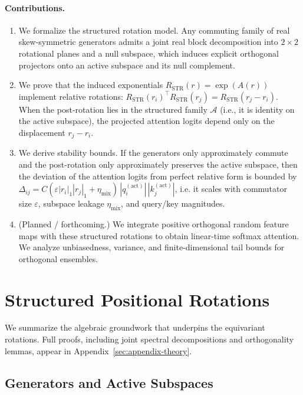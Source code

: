 \documentclass[11pt]{article}
\begin{document}
\paragraph{Contributions.}
\begin{enumerate}[leftmargin=1.5em]
  \item We formalize the structured rotation model. Any commuting family of real skew-symmetric generators admits a joint real block decomposition into $2\times 2$ rotational planes and a null subspace, which induces explicit orthogonal projectors onto an active subspace and its null complement.
  \item We prove that the induced exponentials $R_{\mathrm{STR}}(r) = \exp(A(r))$ implement relative rotations: $R_{\mathrm{STR}}(r_i)^\top R_{\mathrm{STR}}(r_j) = R_{\mathrm{STR}}(r_j - r_i)$. When the post-rotation lies in the structured family $\mathcal{A}$ (i.e., it is identity on the active subspace), the projected attention logits depend only on the displacement $r_j - r_i$.
  \item We derive stability bounds. If the generators only approximately commute and the post-rotation only approximately preserves the active subspace, then the deviation of the attention logits from perfect relative form is bounded by $\Delta_{ij} = C(\varepsilon |r_i|_1 |r_j|_1 + \eta_{\mathrm{mix}})\,|q_i^{(\mathrm{act})}|\,|k_j^{(\mathrm{act})}|$, i.e. it scales with commutator size $\varepsilon$, subspace leakage $\eta_{\mathrm{mix}}$, and query/key magnitudes.
  \item (Planned / forthcoming.) We integrate positive orthogonal random feature maps with these structured rotations to obtain linear-time softmax attention. We analyze unbiasedness, variance, and finite-dimensional tail bounds for orthogonal ensembles.
\end{enumerate}

\section{Structured Positional Rotations}
\label{sec:structured-rotations}

We summarize the algebraic groundwork that underpins the equivariant rotations. Full proofs,
including joint spectral decompositions and orthogonality lemmas, appear in Appendix~\ref{sec:appendix-theory}.

\subsection{Generators and Active Subspaces}
\end{document}
